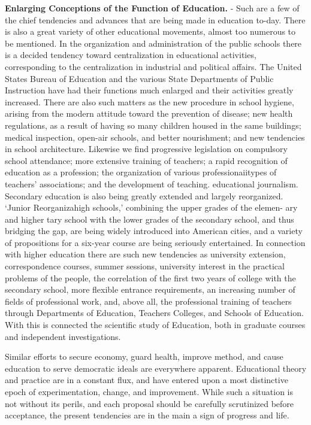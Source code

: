 \documentclass[
]{book}
\begin{document}
\textbf{Enlarging Conceptions of the Function of Education.} - Such are a few of the chief tendencies and advances that are being made in education to-day. There is also a great variety of other educational movements, almost too numerous to be mentioned. In the organization and administration of the public schools there is a decided tendency toward centralization in educational activities, corresponding to the centralization in industrial and political affairs. The United States Bureau of Education and the various State Departments of Public Instruction have had their functions much enlarged and their activities greatly increased. There are also such matters as the new procedure in school hygiene, arising from the modern attitude toward the prevention of disease; new health regulations, as a result of having so many children housed in the same buildings; medical inspection, open-air schools, and better nourishment; and new tendencies in school architecture. Likewise we find progressive legislation on compulsory school attendance; more extensive training of teachers; a rapid recognition of education as a profession; the organization of various professionaiitypes of teachers' associations; and the development of teaching. educational journalism. Secondary education is also being greatly extended and largely reorganized. `Junior Reorganizahigh schools,' combining the upper grades of the elemen- ary and higher tary school with the lower grades of the secondary school, and thus bridging the gap, are being widely introduced into American cities, and a variety of propositions for a six-year course are being seriously entertained. In connection with higher education there are such new tendencies as university extension, correspondence courses, summer sessions, university interest in the practical problems of the people, the correlation of the first two years of college with the secondary school, more flexible entrance requirements, an increasing number of fields of professional work, and, above all, the professional training of teachers through Departments of Education, Teachers Colleges, and Schools of Education. With this is connected the scientific study of Education, both in graduate courses and independent investigations.

Similar efforts to secure economy, guard health, improve method, and cause education to serve democratic ideals are everywhere apparent. Educational theory and practice are in a constant flux, and have entered upon a most distinctive epoch of experimentation, change, and improvement. While such a situation is not without its perils, and each proposal should be carefully scrutinized before acceptance, the present tendencies are in the main a sign of progress and life.
\end{document}
